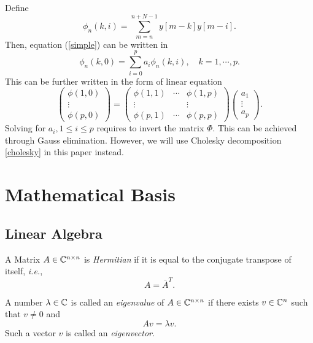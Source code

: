 Define
\begin{equation}
\phi_n(k,i)=\sum_{m=n}^{n+N-1} y[m-k]y[m-i].
\end{equation}
Then, equation (\ref{simple}) can be written in
\begin{equation}
\phi_n(k,0)=\sum_{i=0}^p a_i\phi_n(k,i), \quad  k=1,\cdots,p.
\end{equation}
This can be further written in the form of linear equation
\begin{equation}
	\begin{pmatrix} \phi(1,0)\\ \vdots \\ \phi(p,0) \end{pmatrix}=\begin{pmatrix} \phi(1,1) & \cdots & \phi(1,p) \\ \vdots & & \vdots \\ \phi(p,1) & \cdots & \phi(p,p) \end{pmatrix}\begin{pmatrix} a_1 \\ \vdots \\ a_p \end{pmatrix}.
\end{equation}
Solving for \(a_i, 1\leq i\leq p\) requires to invert the matrix $\Phi$.
This can be achieved through Gauss elimination.
However, we will use Cholesky decomposition \ref{cholesky} in this paper instead.


\section{Mathematical Basis}


\subsection{Linear Algebra}
\begin{definition}
A Matrix \(A\in\mathbb{C}^{n\times n}\) is \emph{Hermitian} if it is equal to the conjugate transpose of itself, \textit{i.e.},
\begin{equation*}
A=\bar{A}^T.
\end{equation*}
\end{definition}


\begin{definition}
A number \(\lambda\in\mathbb{C}\) is called an \emph{eigenvalue} of \(A\in\mathbb{C}^{n\times n}\) if there exists \(v\in\mathbb{C}^n\) such that \(v\neq0\) and
\begin{equation*}
Av=\lambda v.
\end{equation*}
Such a vector $v$ is called an \emph{eigenvector}.
\end{definition}


